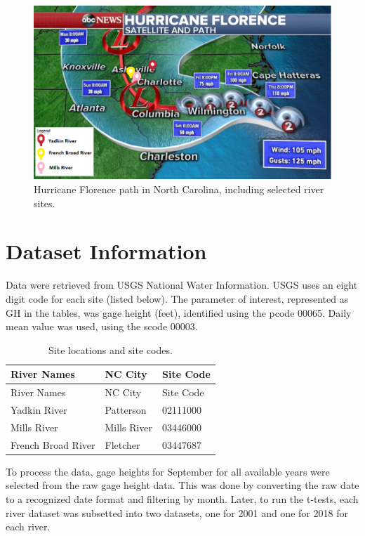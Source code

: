 \documentclass[
  12pt,
]{article}
\begin{document}
\begin{figure}
\centering
\includegraphics[width=\textwidth,height=0.4\textheight]{../Analysis/Hurricane_Path_Sites.png}
\caption{Hurricane Florence path in North Carolina, including selected
river sites.}
\end{figure}

\clearpage

\hypertarget{dataset-information}{%
\section{Dataset Information}\label{dataset-information}}

Data were retrieved from USGS National Water Information. USGS uses an
eight digit code for each site (listed below). The parameter of
interest, represented as GH in the tables, was gage height (feet),
identified using the pcode 00065. Daily mean value was used, using the
scode 00003.

\begin{longtable}[]{@{}lll@{}}
\caption{Site locations and site codes.}\tabularnewline
\toprule
River Names & NC City & Site Code\tabularnewline
\midrule
\endfirsthead
\toprule
River Names & NC City & Site Code\tabularnewline
\midrule
\endhead
Yadkin River & Patterson & 02111000\tabularnewline
Mills River & Mills River & 03446000\tabularnewline
French Broad River & Fletcher & 03447687\tabularnewline
\bottomrule
\end{longtable}

To process the data, gage heights for September for all available years
were selected from the raw gage height data. This was done by converting
the raw date to a recognized date format and filtering by month. Later,
to run the t-tests, each river dataset was subsetted into two datasets,
one for 2001 and one for 2018 for each river.
\end{document}
